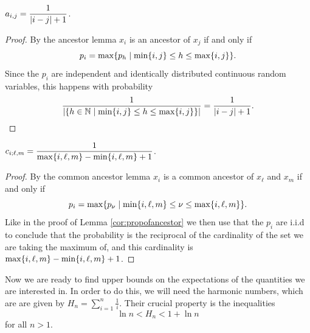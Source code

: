 \begin{cor} \label{cor:propofancestor}
$a_{i,j} = \displaystyle \frac{1}{\left\lvert i - j \right\rvert + 1}$.
\end{cor}
\begin{proof}
By the ancestor lemma $x_i$ is an ancestor of $x_j$ if and only if
\[
    p_i = \max\{p_h \mid \min\{i, j\} \leq h \leq \max\{i, j\}\}.
\]
Since the $p_i$ are independent and identically distributed continuous random variables, this happens with probability
\[
    \frac{1}{\left\lvert \{h \in \mathbb{N} \mid \min\{i, j\} \leq h \leq \max\{i, j\}\} \right\rvert} = \frac{1}{\left\lvert i - j \right\rvert + 1}.
\]
\end{proof}

\begin{cor}
$c_{i;\ell,m} = \displaystyle \frac{1}{\max\{i,\ell,m\} - \min\{i,\ell,m\} + 1}$.
\end{cor}
\begin{proof}
By the common ancestor lemma $x_i$ is a common ancestor of $x_{\ell}$ and $x_m$ if and only if
\[
    p_i = \max\{p_{\nu} \mid \min\{i,\ell,m\} \leq \nu \leq \max\{i,\ell,m\}\}.
\]
Like in the proof of Lemma \ref{cor:propofancestor} we then use that the $p_i$ are i.i.d to conclude that the probability is the reciprocal of the cardinality of the set we are taking the maximum of, and this cardinality is $\max\{i,\ell,m\} - \min\{i,\ell,m\} + 1$.
\end{proof}

Now we are ready to find upper bounds on the expectations of the quantities we are interested in. In order to do this, we will need the harmonic numbers, which are are given by $H_n = \sum_{i=1}^n \frac{1}{i}$. Their crucial property is the inequalities
\[
    \ln n < H_n < 1 + \ln n
\]
for all $n > 1$. 

